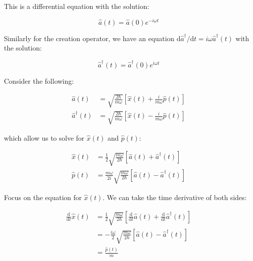 \documentclass[12pt]{article}
\begin{document}
This is a differential equation with the solution:

\begin{equation}
    \hat{a}(t) = \hat{a}(0) e^{-i\omega t}
\end{equation}

Similarly for the creation operator, we have an equation $\mathrm{d}\hat{a}^{\dagger}/\mathrm{d}t = i\omega \hat{a}^{\dagger}(t)$ with the solution:

\begin{equation}
    \hat{a}^{\dagger}(t) = \hat{a}^{\dagger}(0) e^{i\omega t}
\end{equation}

Consider the following:

\begin{equation}
\begin{split}
    \hat{a}(t) &= \sqrt{\frac{2\hbar}{m\omega}} \left[ \hat{x}(t) + \frac{i}{m\omega} \hat{p}(t) \right] \\
    \hat{a}^{\dagger}(t) &= \sqrt{\frac{2\hbar}{m\omega}} \left[ \hat{x}(t) - \frac{i}{m\omega} \hat{p}(t) \right]
\end{split}
\end{equation}

which allow us to solve for $\hat{x}(t)$ and $\hat{p}(t)$:

\begin{equation}
\begin{split}
    \hat{x}(t) &= \frac{1}{2} \sqrt{\frac{m\omega}{2\hbar}} \left[ \hat{a}(t) + \hat{a}^{\dagger}(t) \right] \\
    \hat{p}(t) &= \frac{m\omega}{2i} \sqrt{\frac{m\omega}{2\hbar}} \left[ \hat{a}(t) - \hat{a}^{\dagger}(t) \right]
\end{split}
\end{equation}

Focus on the equation for $\hat{x}(t)$. We can take the time derivative of both sides:

\begin{equation}
\begin{split}
    \frac{\mathrm{d}}{\mathrm{d}t} \hat{x}(t) &= \frac{1}{2} \sqrt{\frac{m\omega}{2\hbar}} \left[ \frac{\mathrm{d}}{\mathrm{d}t} \hat{a}(t) + \frac{\mathrm{d}}{\mathrm{d}t} \hat{a}^{\dagger}(t) \right] \\
    &= -\frac{i\omega}{2} \sqrt{\frac{m\omega}{2\hbar}} \left[ \hat{a}(t) - \hat{a}^{\dagger}(t) \right] \\
    &= \frac{\hat{p}(t)}{m}
\end{split}
\end{equation}
\end{document}
